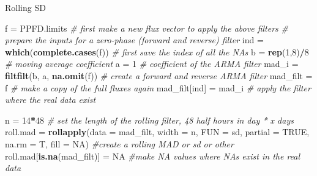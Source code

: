 \documentclass[
]{article}
\newenvironment{Shaded}{\begin{snugshade}}{\end{snugshade}}
\newcommand{\AttributeTok}[1]{\textcolor[rgb]{0.13,0.29,0.53}{#1}}
\newcommand{\CommentTok}[1]{\textcolor[rgb]{0.56,0.35,0.01}{\textit{#1}}}
\newcommand{\ConstantTok}[1]{\textcolor[rgb]{0.56,0.35,0.01}{#1}}
\newcommand{\DecValTok}[1]{\textcolor[rgb]{0.00,0.00,0.81}{#1}}
\newcommand{\FunctionTok}[1]{\textcolor[rgb]{0.13,0.29,0.53}{\textbf{#1}}}
\newcommand{\NormalTok}[1]{#1}
\newcommand{\OtherTok}[1]{\textcolor[rgb]{0.56,0.35,0.01}{#1}}
\newcommand{\SpecialCharTok}[1]{\textcolor[rgb]{0.81,0.36,0.00}{\textbf{#1}}}
\begin{document}
Rolling SD

\begin{Shaded}
\begin{Highlighting}[]
\NormalTok{f }\OtherTok{=}\NormalTok{ PPFD.limits }\CommentTok{\# first make a new flux vector to apply the above filters}
\CommentTok{\# prepare the inputs for a zero{-}phase (forward and reverse) filter  }
\NormalTok{ind       }\OtherTok{=} \FunctionTok{which}\NormalTok{(}\FunctionTok{complete.cases}\NormalTok{(f))   }\CommentTok{\# first save the index of all the NAs}
\NormalTok{b         }\OtherTok{=} \FunctionTok{rep}\NormalTok{(}\DecValTok{1}\NormalTok{,}\DecValTok{8}\NormalTok{)}\SpecialCharTok{/}\DecValTok{8}                 \CommentTok{\# moving average coefficient}
\NormalTok{a         }\OtherTok{=} \DecValTok{1}                          \CommentTok{\# coefficient of the ARMA filter}
\NormalTok{mad\_i    }\OtherTok{=} \FunctionTok{filtfilt}\NormalTok{(b, a, }\FunctionTok{na.omit}\NormalTok{(f)) }\CommentTok{\# create a forward and reverse ARMA filter}
\NormalTok{mad\_filt }\OtherTok{=}\NormalTok{ f                          }\CommentTok{\# make a copy of the full fluxes again}
\NormalTok{mad\_filt[ind] }\OtherTok{=}\NormalTok{ mad\_i                }\CommentTok{\# apply the filter where the real data exist}

\NormalTok{n }\OtherTok{=} \DecValTok{14}\SpecialCharTok{*}\DecValTok{48} \CommentTok{\# set the length of the rolling filter, 48 half hours in day * x days}
\NormalTok{roll.mad }\OtherTok{=} \FunctionTok{rollapply}\NormalTok{(}\AttributeTok{data =}\NormalTok{ mad\_filt,}
                     \AttributeTok{width =}\NormalTok{ n,}
                     \AttributeTok{FUN =}\NormalTok{ sd,}
                     \AttributeTok{partial =} \ConstantTok{TRUE}\NormalTok{,}
                     \AttributeTok{na.rm =}\NormalTok{ T,}
                     \AttributeTok{fill =} \ConstantTok{NA}\NormalTok{)  }\CommentTok{\#create a rolling MAD or sd or other}
\NormalTok{roll.mad[}\FunctionTok{is.na}\NormalTok{(mad\_filt)] }\OtherTok{=} \ConstantTok{NA}  \CommentTok{\#make NA values where NAs exist in the real data}


\end{Highlighting}
\end{Shaded}
\end{document}
